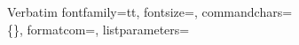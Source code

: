 



\newif\ifpdf
\ifx\pdfoutput\undefined
        \pdffalse
\else
        \pdftrue
\fi



\graphicspath{{fig}}

\usepackage{rotating} %




\setlength{\topmargin}{0in}
\setlength{\textheight}{8.5in}

%
  {Verbatim}%
  {fontfamily=tt,%
   fontsize=\small,%
   commandchars=\\\{\},%
   formatcom=\def\{{\symbol{123}}\def\}{\symbol{125}}\def\\{\symbol{92}},%
   listparameters=\setlength{\topsep}{0pt}%
                  \setlength{\partopsep}{0pt}%
                  \setlength{\parskip}{0pt}%
   }

